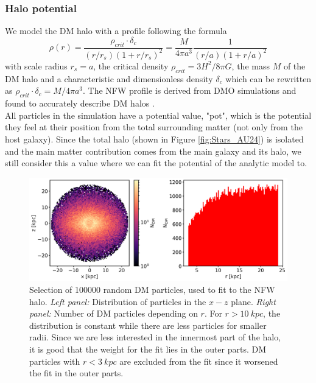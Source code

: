 \subsubsection{Halo potential}\label{subsubsec:halo_pot}
We model the \ac{DM} halo with a  \citep{NFWprofile} profile following the formula 
\begin{equation}
    \rho(r) = \frac{\rho_{crit} \cdot \delta_c}{(r/r_s)(1+r/r_s)^2} = \frac{M}{4 \pi a^3}\frac{1}{(r/a)(1+r/a)^2}
\end{equation} with scale radius $r_s = a$, the critical density $\rho_{crit} = 3H^2 / 8\pi G $, the mass $M$ of the \ac{DM} halo and a characteristic and dimensionless density $\delta_c$ which can be rewritten as \(\rho_{crit}\cdot\delta_c = M/4\pi a^3 \). The \ac{NFW} profile is derived from \ac{DMO} simulations and found to accurately describe \ac{DM} halos \citep{NFWprofile}. 
\\All particles in the simulation have a potential value, "pot", which is the potential they feel at their position from the total surrounding matter (not only from the host galaxy). Since the total halo (shown in Figure \ref{fig:Stars_AU24}) is isolated and the main matter contribution comes from the main galaxy and its halo, we still consider this a value where we can fit the potential of the analytic model to. 
\begin{figure}[htbp]
\captionsetup{format=plain}
    \centering
    \includegraphics[width=\textwidth]{plots/Auriga/DM_selected_part_dist_snap_127.png}
    \caption{Selection of 100000 random \ac{DM} particles, used to fit to the \ac{NFW} halo. \textit{Left panel:} Distribution of particles in the $x-z$ plane. \textit{Right panel:} Number of \ac{DM} particles depending on $r$. For $r > \SI{10}{kpc}$, the distribution is constant while there are less particles for smaller radii. Since we are less interested in the innermost part of the halo, it is good that the weight for the fit lies in the outer parts. \ac{DM} particles with $r < \SI{3}{kpc}$ are excluded from the fit since it worsened the fit in the outer parts.}
    \label{fig:DM_part_selection}
\end{figure}
